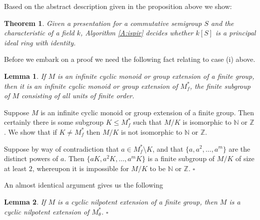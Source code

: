 \documentclass[12pt]{article}
\newtheorem{theorem}{\qquad\bf Theorem}
\newtheorem{lemma}{Lemma}
\newenvironment{proof}{{\it Proof.\/}}{$\square$\\}
\begin{document}
Based on the abstract description given in 
the proposition above we show:

\begin{theorem}\label{t:main}
Given a presentation for a commutative semigroup
$S$  and the characteristic of a field $k$, 
Algorithm \ref{A:ispir} decides whether $k[S]$ is a principal
ideal ring with identity.
\end{theorem}

Before we embark on a proof we need the following 
fact relating to case (i) above.

\begin{lemma}\label{l:fext}
If $M$ is an infinite cyclic monoid or group extension of
a finite group, then it is an infinite cyclic monoid or group extension of
$M^*_f$, the finite subgroup of $M$ consisting of all units of finite 
order.
\end{lemma}

\begin{proof}
Suppose $M$ is an infinite cyclic monoid or group extension of
a finite group. Then certainly there is some subgroup
$K \leq M^*_f$ such that $M/K$ is isomorphic to $\mathbb{N}$ or 
$\mathbb{Z}$. We show that if $K \neq  M^*_f$ then
$M/K$ is not isomorphic to $\mathbb{N}$ or 
$\mathbb{Z}$.

Suppose by way of contradiction 
that $a \in M^*_f \setminus K$, and that $\{a, a^2, \ldots, a^m\}$ are
the distinct powers of $a$.  Then
$\{aK, a^2K, \ldots, a^mK\}$  is a  finite subgroup of $M/K$ of
size at least $2$, whereupon it is impossible for $M/K$ to be
$\mathbb{N}$ or $\mathbb{Z}$. 
\end{proof}

An almost identical argument gives us the following 

\begin{lemma}\label{l:cycnilp}
If $M$ is a cyclic nilpotent extension of a finite group, then
$M$ is a cyclic nilpotent extension of $M^*_\theta$. $\square$
\end{lemma} 
\end{document}
